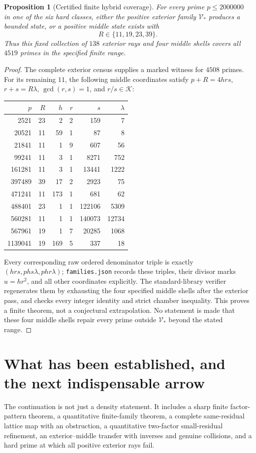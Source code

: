 \documentclass[11pt]{article}
\newtheorem{proposition}[theorem]{Proposition}
\theoremstyle{remark}\newtheorem{remark}[theorem]{Remark}
\begin{document}
\begin{proposition}[Certified finite hybrid coverage]\label{prop:hybrid}
For every prime $p\le2000000$ in one of the six hard classes, either the positive exterior family $\mathcal V_*$ produces a bounded state, or a positive middle state exists with
\[
 R\in\{11,19,23,39\}.
\]
Thus this fixed collection of $138$ exterior rays and four middle shells covers all $4519$ primes in the specified finite range.
\end{proposition}
\begin{proof}
The complete exterior census supplies a marked witness for $4508$ primes. For its remaining $11$, the following middle coordinates satisfy $p+R=4hrs$, $r+s=R\lambda$, $\gcd(r,s)=1$, and $r/s\in\mathcal K$:
\begin{center}
\begin{tabular}{@{}rrrrrr@{}}
\toprule
$p$&$R$&$h$&$r$&$s$&$\lambda$\\
\midrule
2521&23&2&2&159&7\\
20521&11&59&1&87&8\\
21841&11&1&9&607&56\\
99241&11&3&1&8271&752\\
161281&11&3&1&13441&1222\\
397489&39&17&2&2923&75\\
471241&11&173&1&681&62\\
488401&23&1&1&122106&5309\\
560281&11&1&1&140073&12734\\
567961&19&1&7&20285&1068\\
1139041&19&169&5&337&18\\
\bottomrule
\end{tabular}
\end{center}
Every corresponding raw ordered denominator triple is exactly $(hrs,phs\lambda,phr\lambda)$; \texttt{families.json} records these triples, their divisor marks $u=hr^2$, and all other coordinates explicitly. The standard-library verifier regenerates them by exhausting the four specified middle shells after the exterior pass, and checks every integer identity and strict chamber inequality. This proves a finite theorem, not a conjectural extrapolation. No statement is made that these four middle shells repair every prime outside $\mathcal V_*$ beyond the stated range.
\end{proof}

\section{What has been established, and the next indispensable arrow}
The continuation is not just a density statement. It includes a sharp finite factor-pattern theorem, a quantitative finite-family theorem, a complete same-residual lattice map with an obstruction, a quantitative two-factor small-residual refinement, an exterior--middle transfer with inverses and genuine collisions, and a hard prime at which all positive exterior rays fail.
\end{document}
